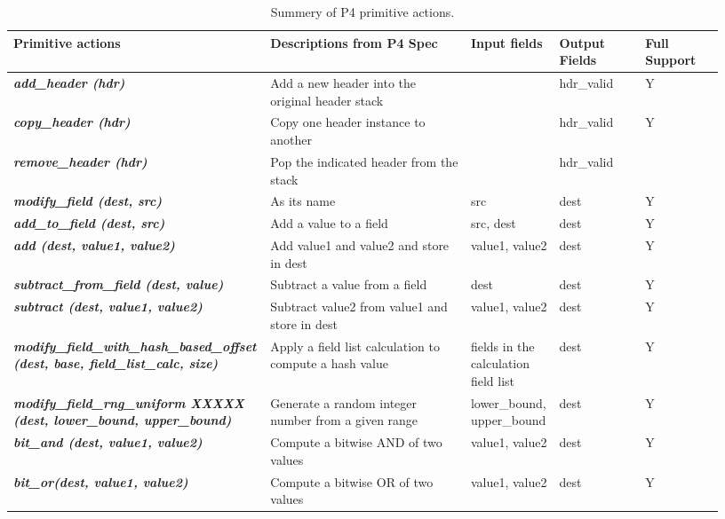 \documentclass[sigconf, 10pt]{acmart}
\theoremstyle{plain}
\begin{document}
\begin{table}[!tbp]
\small
\centering
\caption{Summery of P4 primitive actions.}
\label{tbl:primitive-actions}
\begin{tabular} 
{|m{0.3\linewidth}|m{0.28\linewidth}|m{0.12\linewidth}|m{0.12\linewidth}|m{0.11\linewidth}|}
\hline
\textbf{Primitive actions} & \textbf{Descriptions from P4 Spec} & \textbf{Input fields} & \textbf{Output Fields} & \textbf{Full Support} \\
\hline
\hline
 \textit{\textbf{add\_header (hdr)}} & Add a new header into the original header stack &  & hdr\_valid & Y \\
\hline
 \textbf{\textit{copy\_header (hdr)}} & Copy one header instance to another &  & hdr\_valid & Y \\
\hline
 \textit{\textbf{remove\_header (hdr)}} & Pop the indicated header from the stack & & hdr\_valid & \\
\hline
 \textit{\textbf{modify\_field (dest, src)}} & As its name & src & dest & Y \\
\hline
 \textbf{\textit{add\_to\_field (dest, src)}} & Add a value to a field & src, dest & dest & Y \\
\hline
 \textbf{\textit{add (dest, value1, value2)}} & Add value1 and value2 and store in dest & value1, value2 & dest & Y \\
\hline
 \textit{\textbf{subtract\_from\_field (dest, value)}} & Subtract a value from a field & dest & dest & Y \\
\hline
 \textit{\textbf{subtract (dest, value1, value2)}} & Subtract value2 from value1 and store in dest & value1, value2 & dest & Y \\
\hline
 \textit{\textbf{modify\_field\_with\_hash\_based\_offset (dest, base, field\_list\_calc, size)}} & Apply a field list calculation to compute a hash value & fields in the calculation field list & dest & Y \\
\hline
 \textit{\textbf{modify\_field\_rng\_uniform {\color{white} XXXXX} (dest, lower\_bound, upper\_bound)}} & Generate a random integer number from a given range & lower\_bound, upper\_bound & dest & Y \\
\hline
 \textit{\textbf{bit\_and (dest, value1, value2)}} & Compute a bitwise AND of two values & value1, value2 & dest & Y \\
\hline
 \textit{\textbf{bit\_or(dest, value1, value2)}} & Compute a bitwise OR of two values& value1, value2 & dest & Y \\

\end{tabular}
\end{table}
\end{document}
